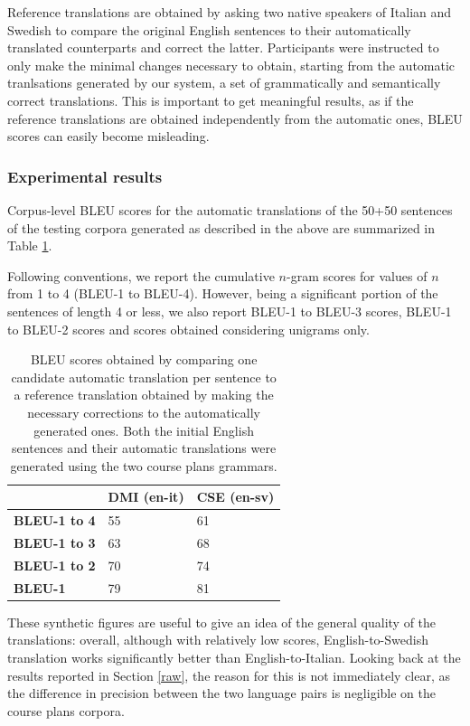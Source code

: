 \documentclass[11pt]{article}
\begin{document}
Reference translations are obtained by asking two native speakers of Italian and Swedish to compare the original English sentences to their automatically translated counterparts and correct the latter.
Participants were instructed to only make the minimal changes necessary to obtain, starting from the automatic tranlsations generated by our system, a set of grammatically and semantically correct translations. 
This is important to get meaningful results, as if the reference translations are obtained independently from the automatic ones, BLEU scores can easily become misleading.

\subsubsection{Experimental results} 
Corpus-level BLEU scores for the automatic translations of the 50+50 sentences of the testing corpora generated as described in the above are summarized in Table \ref{tableu}.

Following conventions, we report the cumulative $n$-gram scores for values of $n$ from 1 to 4 (BLEU-1 to BLEU-4). 
However, being a significant portion of the sentences of length 4 or less, we also report BLEU-1 to BLEU-3 scores, BLEU-1 to BLEU-2 scores and scores obtained considering unigrams only. 

\begin{table}[h]
  \centering
  \begin{tabular}{l|ll}
  \textbf{}            & \textbf{DMI (en-it)} & \textbf{CSE (en-sv)} \\ \hline
  \textbf{BLEU-1 to 4} & 55         & 61         \\ 
  \textbf{BLEU-1 to 3} & 63         & 68         \\ 
  \textbf{BLEU-1 to 2} & 70         & 74          \\
  \textbf{BLEU-1}      & 79         & 81         \\ 
  \end{tabular}
  \caption[BLEU scores for automatic translations based on the course plans grammars]{BLEU scores obtained by comparing one candidate automatic translation per sentence to a reference translation obtained by making the necessary corrections to the automatically generated ones. Both the initial English sentences and their automatic translations were generated using the two course plans grammars.}
  \label{tableu}
\end{table}

These synthetic figures are useful to give an idea of the general quality of the translations: overall, although with relatively low scores, English-to-Swedish translation works significantly better than English-to-Italian. 
Looking back at the results reported in Section \ref{raw}, the reason for this is not immediately clear, as the difference in precision between the two language pairs is negligible on the course plans corpora.
\end{document}
